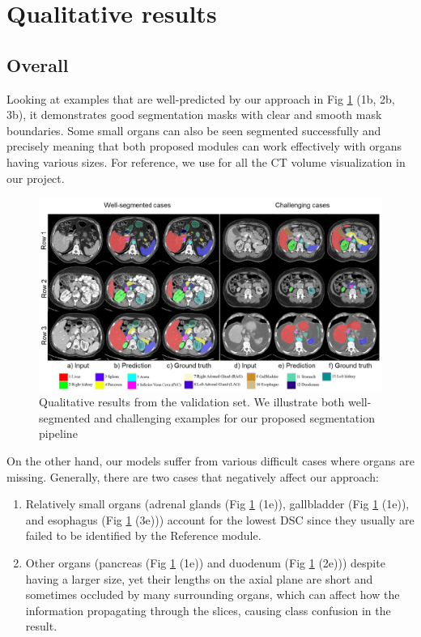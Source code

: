 \section{Qualitative results}
\label{sec:qualitative}

\subsection{Overall}

Looking at examples that are well-predicted by our approach in Fig \ref{fig:qualitative} (1b, 2b, 3b), it demonstrates good segmentation masks with clear and smooth mask boundaries. Some small organs can also be seen segmented successfully and precisely meaning that both proposed modules can work effectively with organs having various sizes. For reference, we use \cite{py06itksnap} for all the CT volume visualization in our project.

\begin{figure}[!h]
\centering
\includegraphics[width=\textwidth]{content/resources/new_images/qualitative.pdf}
\caption{Qualitative results from the validation set. We illustrate both well-segmented and challenging examples for our proposed segmentation pipeline}
\label{fig:qualitative}
\end{figure}

On the other hand, our models suffer from various difficult cases where organs are missing. Generally, there are two cases that negatively affect our approach:

\begin{enumerate}
    \item Relatively small organs (adrenal glands (Fig \ref{fig:qualitative} (1e)), gallbladder (Fig \ref{fig:qualitative} (1e)), and esophagus (Fig \ref{fig:qualitative} (3e))) account for the lowest DSC since they usually are failed to be identified by the Reference module.
    \item Other organs (pancreas (Fig \ref{fig:qualitative} (1e)) and duodenum (Fig \ref{fig:qualitative} (2e))) despite having a larger size, yet their lengths on the axial plane are short and sometimes occluded by many surrounding organs, which can affect how the information propagating through the slices, causing class confusion in the result. 
\end{enumerate}

